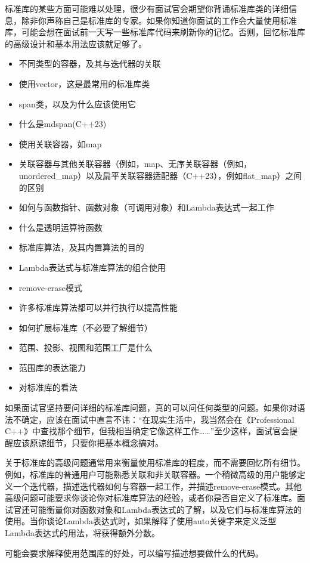 
标准库的某些方面可能难以处理，很少有面试官会期望你背诵标准库类的详细信息，除非你声称自己是标准库的专家。如果你知道你面试的工作会大量使用标准库，可能会想在面试前一天写一些标准库代码来刷新你的记忆。否则，回忆标准库的高级设计和基本用法应该就足够了。


\begin{itemize}
\item
不同类型的容器，及其与迭代器的关联

\item
使用vector，这是最常用的标准库类

\item
span类，以及为什么应该使用它

\item
什么是mdspan(C++23)

\item
使用关联容器，如map

\item
关联容器与其他关联容器（例如，map、无序关联容器（例如，unordered\_map）以及扁平关联容器适配器（C++23），例如flat\_map）之间的区别

\item
如何与函数指针、函数对象（可调用对象）和Lambda表达式一起工作

\item
什么是透明运算符函数

\item
标准库算法，及其内置算法的目的

\item
Lambda表达式与标准库算法的组合使用

\item
remove-erase模式

\item
许多标准库算法都可以并行执行以提高性能

\item
如何扩展标准库（不必要了解细节）

\item
范围、投影、视图和范围工厂是什么

\item
范围库的表达能力

\item
对标准库的看法
\end{itemize}


如果面试官坚持要问详细的标准库问题，真的可以问任何类型的问题。如果你对语法不确定，应该在面试中直言不讳：“在现实生活中，我当然会在《Professional C++》中查找那个细节，但我相当确定它像这样工作……”至少这样，面试官会提醒应该原谅细节，只要你把基本概念搞对。

关于标准库的高级问题通常用来衡量使用标准库的程度，而不需要回忆所有细节。例如，标准库的普通用户可能熟悉关联和非关联容器。一个稍微高级的用户能够定义一个迭代器，描述迭代器如何与容器一起工作，并描述remove-erase模式。其他高级问题可能要求你谈论你对标准库算法的经验，或者你是否自定义了标准库。面试官还可能衡量你对函数对象和Lambda表达式的了解，以及它们与标准库算法的使用。当你谈论Lambda表达式时，如果解释了使用auto关键字来定义泛型Lambda表达式的用法，将获得额外分数。

可能会要求解释使用范围库的好处，可以编写描述想要做什么的代码。













